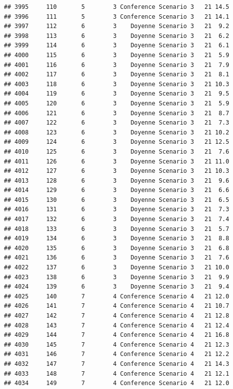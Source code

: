 \documentclass[
]{article}
\begin{document}
\begin{verbatim}
## 3995     110       5        3 Conference Scenario 3   21 14.5
## 3996     111       5        3 Conference Scenario 3   21 14.1
## 3997     112       6        3    Doyenne Scenario 3   21  9.2
## 3998     113       6        3    Doyenne Scenario 3   21  6.2
## 3999     114       6        3    Doyenne Scenario 3   21  6.1
## 4000     115       6        3    Doyenne Scenario 3   21  5.9
## 4001     116       6        3    Doyenne Scenario 3   21  7.9
## 4002     117       6        3    Doyenne Scenario 3   21  8.1
## 4003     118       6        3    Doyenne Scenario 3   21 10.3
## 4004     119       6        3    Doyenne Scenario 3   21  9.5
## 4005     120       6        3    Doyenne Scenario 3   21  5.9
## 4006     121       6        3    Doyenne Scenario 3   21  8.7
## 4007     122       6        3    Doyenne Scenario 3   21  7.3
## 4008     123       6        3    Doyenne Scenario 3   21 10.2
## 4009     124       6        3    Doyenne Scenario 3   21 12.5
## 4010     125       6        3    Doyenne Scenario 3   21  7.6
## 4011     126       6        3    Doyenne Scenario 3   21 11.0
## 4012     127       6        3    Doyenne Scenario 3   21 10.3
## 4013     128       6        3    Doyenne Scenario 3   21  9.6
## 4014     129       6        3    Doyenne Scenario 3   21  6.6
## 4015     130       6        3    Doyenne Scenario 3   21  6.5
## 4016     131       6        3    Doyenne Scenario 3   21  7.3
## 4017     132       6        3    Doyenne Scenario 3   21  7.4
## 4018     133       6        3    Doyenne Scenario 3   21  5.7
## 4019     134       6        3    Doyenne Scenario 3   21  8.8
## 4020     135       6        3    Doyenne Scenario 3   21  6.8
## 4021     136       6        3    Doyenne Scenario 3   21  7.6
## 4022     137       6        3    Doyenne Scenario 3   21 10.0
## 4023     138       6        3    Doyenne Scenario 3   21  9.9
## 4024     139       6        3    Doyenne Scenario 3   21  9.4
## 4025     140       7        4 Conference Scenario 4   21 12.0
## 4026     141       7        4 Conference Scenario 4   21 10.7
## 4027     142       7        4 Conference Scenario 4   21 12.8
## 4028     143       7        4 Conference Scenario 4   21 12.4
## 4029     144       7        4 Conference Scenario 4   21 16.8
## 4030     145       7        4 Conference Scenario 4   21 12.3
## 4031     146       7        4 Conference Scenario 4   21 12.2
## 4032     147       7        4 Conference Scenario 4   21 14.3
## 4033     148       7        4 Conference Scenario 4   21 12.1
## 4034     149       7        4 Conference Scenario 4   21 12.0

\end{verbatim}
\end{document}
